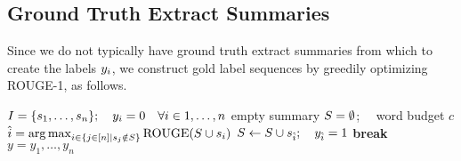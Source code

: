 \subsection{Ground Truth Extract Summaries}
Since we do not typically have ground truth extract summaries from which to
create the labels $\slabel_i$, we construct gold label sequences 
by greedily optimizing ROUGE-1, as follows.


\begin{algorithmic}

\State $I = \{\sent[1], \ldots, \sent[n]\};\quad y_i = 0 \quad \forall i \in 1, \ldots, n$
\State    empty summary $S = \emptyset$; ~~word budget $c$
\State $\hat{i} = {\argmax}_{ i \in \{j \in [n]| \sent[j] \notin \summary\}} \rouge(\summary \cup \sent[i])$
\If {$\rouge(\summary \cup \sent[\hat{i}]) > \rouge(\summary)$}
\State $\summary \gets \summary \cup \sent[\hat{i}]; \quad y_{\hat{i}} = 1$
        \Else
        \State \textbf{break} 
       \EndIf
\EndWhile
\State \Return $y=y_1, \ldots, y_n$
\end{algorithmic}

